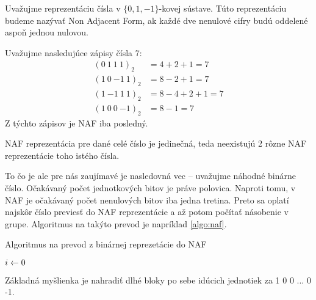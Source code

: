 \begin{definicia}
    Uvažujme reprezentáciu čísla v $\{0,1,-1\}$-kovej sústave.
    Túto reprezentáciu budeme nazývať Non Adjacent Form, ak každé dve
    nenulové cifry budú oddelené aspoň jednou nulovou.
\end{definicia}

\begin{priklad}
    Uvažujme nasledujúce zápisy čísla 7:
    \begin{align*}
        (0\ 1\ 1\ 1)_2 &= 4+2+1=7 \\
        (1\ 0\ {-1}\ 1)_2 &= 8-2+1=7 \\
        (1\ {-1}\ 1\ 1)_2 &= 8-4+2+1=7 \\
        (1\ 0\ 0\ {-1})_2 &= 8-1=7
    \end{align*}
    Z týchto zápisov je NAF iba posledný.
\end{priklad}

\begin{poznamka}
    NAF reprezentácia pre dané celé číslo je jedinečná, teda
    neexistujú 2 rôzne NAF reprezentácie toho istého čísla.
\end{poznamka}

To čo je ale pre nás zaujímavé je nasledovná vec -- uvažujme náhodné
binárne číslo. Očakávaný počet jednotkových bitov je práve polovica.
Naproti tomu, v NAF je očakávaný počet nenulových bitov iba jedna
tretina. Preto sa oplatí najskôr číslo previesť do NAF reprezentácie a
až potom počítať násobenie v grupe. Algoritmus na takýto prevod je
napríklad \ref{algo:naf}.

\begin{algorithm}[H]
    \caption{Algoritmus na prevod z binárnej reprezetácie do NAF}
    \label{algo:naf}
    $i \leftarrow 0$\;
\end{algorithm}

Základná myšlienka je nahradiť dlhé bloky po sebe idúcich jednotiek za
1 0 0 ... 0 -1.

